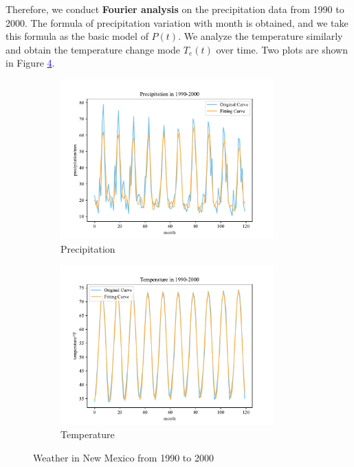 \documentclass{mcmthesis}
\begin{document}
Therefore, we conduct \textbf{Fourier analysis} on the precipitation data from 1990 to 2000. The formula of precipitation variation with month is obtained, and we take this formula as the basic model of $P(t)$. We analyze the temperature similarly and obtain the temperature change mode $T_e(t)$ over time. Two plots are shown in Figure \hyperref[fig:weather]{\textcolor{blue}{4}}.


\begin{figure}[htbp]
\centering
\begin{subfigure}[t]{0.48\textwidth}
\centering
\includegraphics[width=0.9\textwidth]{img/precipitation in 1990-2000.pdf}
\caption{Precipitation}
\end{subfigure}
\hfill
\begin{subfigure}[t]{0.48\textwidth}
\centering
\includegraphics[width=0.9\textwidth]{img/temperature in 1990-2000.pdf}
\caption{Temperature}
\end{subfigure}
\caption{Weather in New Mexico from 1990 to 2000}
\label{fig:weather}
\end{figure}
\end{document}
